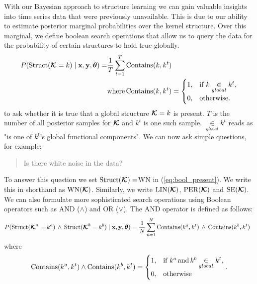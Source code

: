With our Bayesian approach to structure learning we can gain valuable insights
into time series data that were previously unavailable.
This is due to our ability to estimate posterior marginal probabilities over the kernel structure.
Over this marginal, we define boolean search operations that allow us to query the data
for the probability of certain structures to hold true globally.
\begin{align}
\label{eq:bool_present}
P(\text{Struct}(\bm{\mathcal{K}}=k) \mid \mathbf{x},\mathbf{y},\bm{\theta}) =& \frac{1}{T}
\sum\limits_{t=1}^T \text{Contains}(k,k^t)\\
&\text{where}\, \text{Contains}(k,k^t) = \begin{cases}
  1, & \text{if } k \underset{global}{\in} k^t, \\
  0, & \text{otherwise}.
\end{cases} 
\end{align}
to ask whether it is true that a global structure $\bm{\mathcal{K}}=k$ is present. $T$
is the number of all posterior samples for $\bm{\mathcal{K}}$ and $k^t$ is one such
sample. $\underset{global}{\in} k^t$ reads as "is one of $k^t$'s global
functional components".
We can now ask simple questions, for example:
\begin{quotation}
Is there white noise in the data?
\end{quotation}
To answer this question we set $\text{Struct}(\bm{\mathcal{K}}) = $WN in (\ref{eq:bool_present}). We write this in
shorthand as $\text{WN}(\bm{\mathcal{K}})$. Similarly, we write $\text{LIN}(\bm{\mathcal{K}})$, $\text{PER}(\bm{\mathcal{K}})$ and $\text{SE}(\bm{\mathcal{K}})$. 
We can also formulate more sophisticated search operations using Boolean operators such as AND ($\land$) and OR ($\lor$).
The AND operator is defined as follows:
\[
P(\text{Struct}(\bm{\mathcal{K}}^a=k^a)\, \land\, \text{Struct}(\bm{\mathcal{K}}^b=k^b) \mid \mathbf{x},\mathbf{y}, \bm{\theta})  = \frac{1}{N}
\sum\limits_{n=1}^N \text{Contains}(k^a,k^t)\, \land \, \text{Contains}(k^b,k^t)\;\;
\]
where
\[
\text{Contains}(k^a,k^t) \land \text{Contains}(k^b,k^t) = \begin{cases}
  1, & \text{if } k^a\, \text{and}\, k^b  \underset{global}{\in} k^t, \\
  0, & \text{otherwise}\end{cases}.
\]


